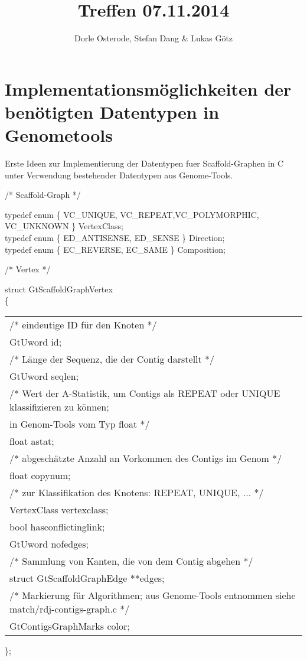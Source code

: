 \documentclass[a4paper,10pt,parskip]{scrartcl}
\title{Treffen 07.11.2014}
\author{Dorle Osterode, Stefan Dang \& Lukas Götz}
\begin{document}
\maketitle{}

\section{Implementationsmöglichkeiten der benötigten Datentypen in Genometools}

Erste Ideen zur Implementierung der Datentypen fuer Scaffold-Graphen in C unter
Verwendung bestehender Datentypen aus Genome-Tools.

/* Scaffold-Graph */

typedef enum \{ VC\_UNIQUE, VC\_REPEAT,VC\_POLYMORPHIC, VC\_UNKNOWN \}
	 	VertexClass;\\
typedef enum \{ ED\_ANTISENSE, ED\_SENSE \} Direction;\\
typedef enum \{ EC\_REVERSE, EC\_SAME \} Composition;

/* Vertex */

struct GtScaffoldGraphVertex\\
\{\\
\begin{tabular}{l}
  /* eindeutige ID für den Knoten */\\
  GtUword id;\\
  /* Länge der Sequenz, die der Contig darstellt */\\
  GtUword seqlen;\\ 
  /* Wert der A-Statistik, um Contigs als REPEAT oder UNIQUE
     klassifizieren zu können;\\
     in Genom-Tools vom Typ float */\\
  float astat;\\	
  /* abgeschätzte Anzahl an Vorkommen des Contigs im Genom */\\
  float copynum;\\  
  /* zur Klassifikation des Knotens: REPEAT, UNIQUE, ... */\\
  VertexClass vertexclass;\\ 
  bool hasconflictinglink;\\
  GtUword nofedges;\\
  /* Sammlung von Kanten, die von dem Contig abgehen */\\
  struct GtScaffoldGraphEdge   **edges;\\  
  /* Markierung für Algorithmen; aus Genome-Tools entnommen siehe
  match/rdj-contigs-graph.c */\\
  GtContigsGraphMarks color;\\ 	  
\end{tabular}
\};
\end{document}
